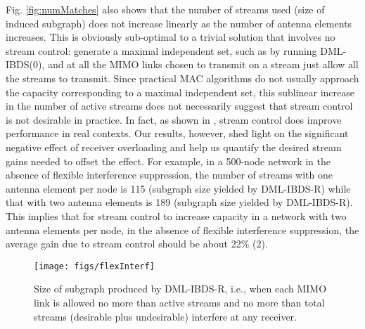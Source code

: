 \documentclass[journal,12pt,onecolumn]{IEEEtran}
\begin{document}
Fig.\,\,\ref{fig:numMatches} also shows that the number of streams used
(size of induced subgraph) does not increase linearly as the number of antenna elements increases. This is
obviously sub-optimal to a trivial solution that involves no stream
control: generate a maximal independent set, such as by running
DML-IBDS(0), and at all the MIMO links chosen to transmit on a 
stream just 
allow all the streams to transmit. Since practical MAC algorithms
do not usually approach the capacity corresponding to a maximal
independent set, this sublinear increase in the number of active
streams does not necessarily suggest that stream control is not
desirable in practice. In fact, as shown in \cite{SunSiv2004}, stream
control does improve performance in real contexts. Our results,
however, shed light on the 
significant negative effect of receiver overloading and help us
quantify the desired stream gains needed to offset the effect. For example,
in a 500-node network in the absence of flexible interference
suppression, the number of streams with one antenna element per node is
115 (subgraph size yielded by DML-IBDS-R) while that with two antenna
elements is 189 (subgraph size yielded by DML-IBDS-R). This implies  
that for stream control to increase capacity in a network with two
antenna elements per node, in the absence of
flexible interference suppression, the average gain due to stream
control should be about 22\% (2).

\begin{figure}[!t]
\begin{center}
\texttt{[image: figs/flexInterf]}
\caption{Size of subgraph produced by DML-IBDS-R, i.e., when
  each MIMO link is allowed no more than  active streams and no
  more than  total streams (desirable plus undesirable) interfere
  at any receiver.}
\label{fig:flexInterf}
\end{center}
\end{figure}
\end{document}

